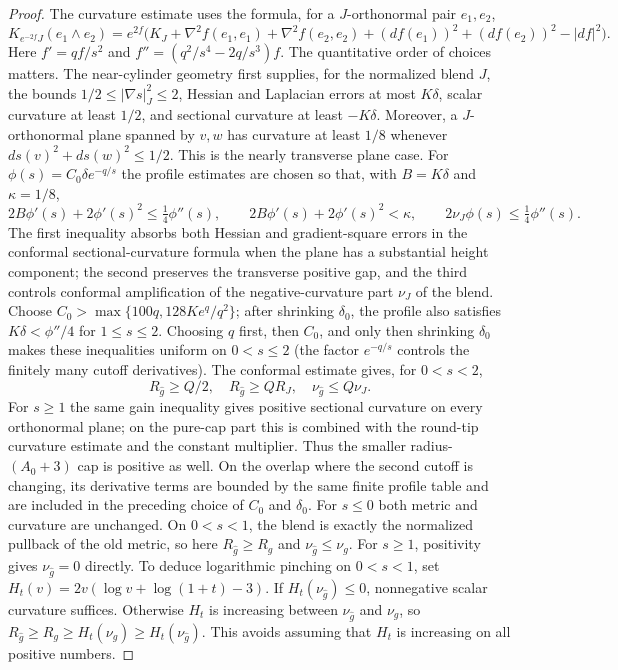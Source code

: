 \begin{proof}
The curvature estimate uses the formula, for a $J$-orthonormal pair
$e_1,e_2$,
\[
 K_{e^{-2f}J}(e_1\wedge e_2)=e^{2f}
 \bigl(K_J+\nabla^2f(e_1,e_1)+\nabla^2f(e_2,e_2)
 +(df(e_1))^2+(df(e_2))^2-|df|^2\bigr).
\]
Here $f'=qf/s^2$ and $f''=(q^2/s^4-2q/s^3)f$.
The quantitative order of choices matters.  The near-cylinder geometry
first supplies, for the normalized blend $J$, the bounds
$1/2\leq|\nabla s|_J^2\leq2$, Hessian and Laplacian errors at most
$K\delta$, scalar curvature at least $1/2$, and sectional curvature
at least $-K\delta$. Moreover, a $J$-orthonormal plane spanned by $v,w$
has curvature at least $1/8$ whenever
$ds(v)^2+ds(w)^2\leq1/2$. This is the nearly transverse plane case.
For $\phi(s)=C_0\delta e^{-q/s}$ the profile estimates are chosen so that,
with $B=K\delta$ and $\kappa=1/8$,
\[
 2B\phi'(s)+2\phi'(s)^2\leq\tfrac14\phi''(s),\qquad
 2B\phi'(s)+2\phi'(s)^2<\kappa,\qquad
 2\nu_J\phi(s)\leq\tfrac14\phi''(s).
\]
The first inequality absorbs both Hessian and gradient-square errors in
the conformal sectional-curvature formula when the plane has a substantial
height component; the second preserves the transverse positive gap, and
the third controls conformal amplification of the negative-curvature part
$\nu_J$ of the blend. Choose
$C_0>\max\{100q,128K e^q/q^2\}$; after shrinking $\delta_0$,
the profile also satisfies $K\delta<\phi''/4$ for $1\leq s\leq2$.
Choosing $q$ first, then $C_0$, and only then shrinking
$\delta_0$ makes these inequalities uniform on $0<s\leq2$ (the factor
$e^{-q/s}$ controls the finitely many cutoff derivatives).  The
conformal estimate gives, for $0<s<2$,
\[
 R_{\widehat g}\geq Q/2,\quad R_{\widehat g}\geq Q R_J,
 \quad\nu_{\widehat g}\leq Q\nu_J.
\]
For $s\geq1$ the same gain inequality gives positive sectional curvature
on every orthonormal plane; on the pure-cap part this is combined with
the round-tip curvature estimate and the constant multiplier.  Thus the
smaller radius-$(A_0+3)$ cap is positive as well.  On the overlap where
the second cutoff is changing, its derivative terms are bounded by the
same finite profile table and are included in the preceding choice of
$C_0$ and $\delta_0$.
For $s\leq0$ both metric and curvature are unchanged. On $0<s<1$,
the blend is exactly the normalized pullback of the old metric, so here
$R_{\widehat g}\geq R_g$ and $\nu_{\widehat g}\leq\nu_g$.
For $s\geq1$, positivity gives $\nu_{\widehat g}=0$ directly.
To deduce logarithmic pinching on $0<s<1$, set
$H_t(v)=2v(\log v+\log(1+t)-3)$.
If $H_t(\nu_{\widehat g})\leq0$, nonnegative scalar curvature suffices.
Otherwise $H_t$ is increasing between $\nu_{\widehat g}$ and $\nu_g$,
so $R_{\widehat g}\geq R_g\geq H_t(\nu_g)
\geq H_t(\nu_{\widehat g})$.  This avoids assuming that $H_t$ is
increasing on all positive numbers.


\end{proof}
